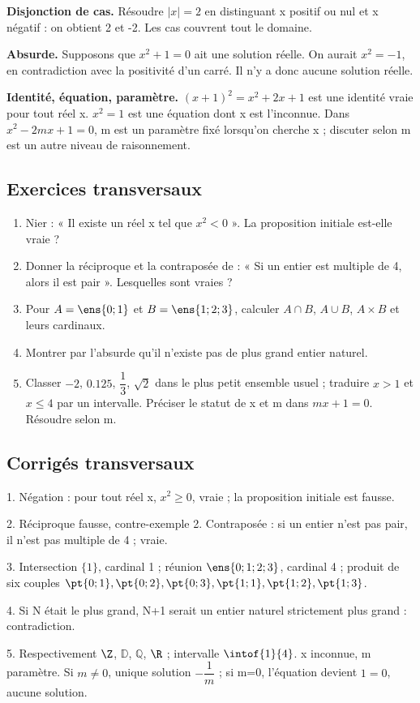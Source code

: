 \textbf{Disjonction de cas.} Résoudre $|x|=2$ en distinguant x positif ou nul et x négatif : on obtient 2 et -2. Les cas couvrent tout le domaine.\par
\textbf{Absurde.} Supposons que $x^2+1=0$ ait une solution réelle. On aurait $x^2=-1$, en contradiction avec la positivité d’un carré. Il n’y a donc aucune solution réelle.\par
\textbf{Identité, équation, paramètre.} $(x+1)^2=x^2+2x+1$ est une identité vraie pour tout réel x. $x^2=1$ est une équation dont x est l’inconnue. Dans $x^2-2mx+1=0$, m est un paramètre fixé lorsqu’on cherche x ; discuter selon m est un autre niveau de raisonnement.

\subsection*{Exercices transversaux}\label{LOG-EX}
\begin{enumerate}
\item Nier : « Il existe un réel x tel que $x^2<0$ ». La proposition initiale est-elle vraie ?
\item Donner la réciproque et la contraposée de : « Si un entier est multiple de 4, alors il est pair ». Lesquelles sont vraies ?
\item Pour $A=\ens{0;1}$ et $B=\ens{1;2;3}$, calculer $A\cap B$, $A\cup B$, $A\times B$ et leurs cardinaux.
\item Montrer par l’absurde qu’il n’existe pas de plus grand entier naturel.
\item Classer $-2$, $\num{0,125}$, $\dfrac{1}{3}$, $\sqrt2$ dans le plus petit ensemble usuel ; traduire $x>1$ et $x\leq4$ par un intervalle. Préciser le statut de x et m dans $mx+1=0$. Résoudre selon m.
\end{enumerate}
\ifmxteacher
\subsection*{Corrigés transversaux}
1. Négation : pour tout réel x, $x^2\geq0$, vraie ; la proposition initiale est fausse.\par
2. Réciproque fausse, contre-exemple 2. Contraposée : si un entier n’est pas pair, il n’est pas multiple de 4 ; vraie.\par
3. Intersection $\{1\}$, cardinal 1 ; réunion $\ens{0;1;2;3}$, cardinal 4 ; produit de six couples $\pt{0;1},\pt{0;2},\pt{0;3},\pt{1;1},\pt{1;2},\pt{1;3}$.\par
4. Si N était le plus grand, N+1 serait un entier naturel strictement plus grand : contradiction.\par
5. Respectivement $\Z$, $\mathbb D$, $\mathbb Q$, $\R$ ; intervalle $\intof{1}{4}$. x inconnue, m paramètre. Si $m\ne0$, unique solution $-\dfrac{1}{m}$ ; si m=0, l’équation devient $1=0$, aucune solution.
\fi

